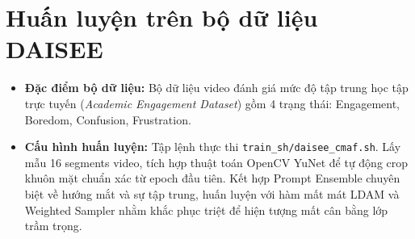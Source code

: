 \documentclass[10pt,a4paper]{article}
\begin{document}
\section{Huấn luyện trên bộ dữ liệu DAISEE}
\begin{itemize}[leftmargin=18pt, itemsep=2pt]
    \item \textbf{Đặc điểm bộ dữ liệu:} Bộ dữ liệu video đánh giá mức độ tập trung học tập trực tuyến (\textit{Academic Engagement Dataset}) gồm 4 trạng thái: Engagement, Boredom, Confusion, Frustration.
    \item \textbf{Cấu hình huấn luyện:} Tập lệnh thực thi \texttt{train\_sh/daisee\_cmaf.sh}. Lấy mẫu 16 segments video, tích hợp thuật toán OpenCV YuNet để tự động crop khuôn mặt chuẩn xác từ epoch đầu tiên. Kết hợp Prompt Ensemble chuyên biệt về hướng mắt và sự tập trung, huấn luyện với hàm mất mát LDAM và Weighted Sampler nhằm khắc phục triệt để hiện tượng mất cân bằng lớp trầm trọng.
\end{itemize}
\end{document}
